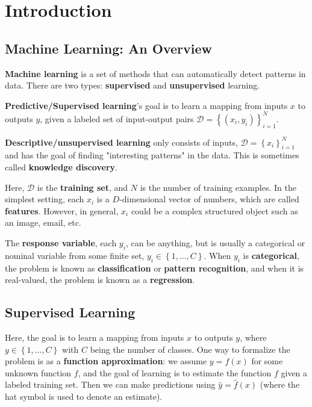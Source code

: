 \chapter{Introduction}
\section{Machine Learning: An Overview}
\textbf{Machine learning} is a set of methods that can automatically detect patterns in data. There are two types: \textbf{supervised} and \textbf{unsupervised} learning.
 
\begin{definition}
	\textbf{Predictive/Supervised learning}'s goal is to learn a mapping from inputs \(x\) to outputs \(y\), given a labeled set of input-output pairs \(\mathcal{D} = \left\{ (x_i, y_i) \right\} _{i=1}^N\).
\end{definition}

\begin{definition}
	\textbf{Descriptive/unsupervised learning} only consists of inputs, \(\mathcal{D} = \left\{ x_i \right\} _{i=1}^N\) and has the goal of finding "interesting patterns" in the data. This is sometimes called \textbf{knowledge discovery}.
\end{definition}

Here, \(\mathcal{D} \) is the \textbf{training set}, and \(N\) is the number of training examples. In the simplest setting, each \(x_i\) is a \(D\)-dimensional vector of numbers, which are called \textbf{features}. However, in general, \(x_i\) could be a complex structured object such as an image, email, etc. \par

The \textbf{response variable}, each \(y_i\), can be anything, but is usually a categorical or nominal variable from some finite set, \(y_i \in \left\{ 1, \ldots , C \right\} \). When \(y_i\) is \textbf{categorical}, the problem is known as \textbf{classification} or \textbf{pattern recognition}, and when it is real-valued, the problem is known as a \textbf{regression}. 

\section{Supervised Learning}
Here, the goal is to learn a mapping from inputs \(x\) to outputs \(y\), where \(y \in \left\{ 1, \ldots , C \right\} \) with \(C\) being the number of classes. One way to formalize the problem is as a \textbf{function approximation}: we assume \(y=f(x)\) for some unknown function \(f\), and the goal of learning is to estimate the function \(f\) given a labeled training set. Then we can make predictions using \(\hat{y}=\hat{f}(x)\) (where the hat symbol is used to denote an estimate). \par

